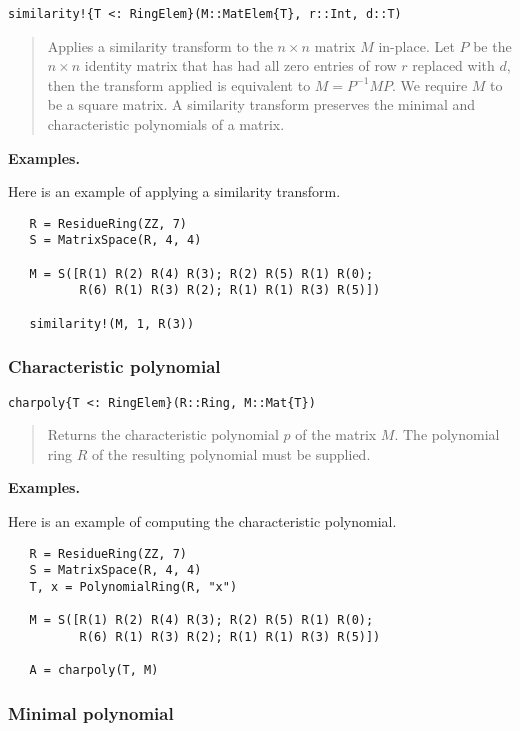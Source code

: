 \documentclass[a4paper,10pt]{article}
\newcommand{\desc}[1]{\vspace{-3mm}\begin{quote}#1\end{quote}}
\begin{document}
\begin{lstlisting}
similarity!{T <: RingElem}(M::MatElem{T}, r::Int, d::T)
\end{lstlisting}

\desc{Applies a similarity transform to the $n\times n$ matrix $M$ in-place.
Let $P$ be the $n\times n$ identity matrix that has had all zero entries
of row $r$ replaced with $d$, then the transform applied is equivalent to
$M = P^{-1}MP$. We require $M$ to be a square matrix. A similarity transform
preserves the minimal and characteristic polynomials of a matrix.}

\textbf{Examples.}

Here is an example of applying a similarity transform.

\begin{lstlisting}
   R = ResidueRing(ZZ, 7)
   S = MatrixSpace(R, 4, 4)
   
   M = S([R(1) R(2) R(4) R(3); R(2) R(5) R(1) R(0);
          R(6) R(1) R(3) R(2); R(1) R(1) R(3) R(5)])
   
   similarity!(M, 1, R(3))
\end{lstlisting}

\subsubsection{Characteristic polynomial}

\begin{lstlisting}
charpoly{T <: RingElem}(R::Ring, M::Mat{T})
\end{lstlisting}

\desc{Returns the characteristic polynomial $p$ of the matrix $M$. The
polynomial ring $R$ of the resulting polynomial must be supplied.}

\textbf{Examples.}

Here is an example of computing the characteristic polynomial.

\begin{lstlisting}
   R = ResidueRing(ZZ, 7)
   S = MatrixSpace(R, 4, 4)
   T, x = PolynomialRing(R, "x")

   M = S([R(1) R(2) R(4) R(3); R(2) R(5) R(1) R(0);
          R(6) R(1) R(3) R(2); R(1) R(1) R(3) R(5)])
   
   A = charpoly(T, M)
\end{lstlisting}

\subsubsection{Minimal polynomial}
\end{document}
